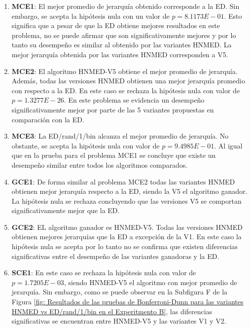 \begin{enumerate}
	\item \textbf{MCE1}: El mejor promedio de jerarquía obtenido corresponde a la ED. Sin embargo, se acepta la hipótesis nula con un valor de $p=8.1173E-01$. Esto significa que a pesar de que la ED obtiene mejores resultados en este problema,  no se puede afirmar que son significativamente mejores y por lo tanto su desempeño es similar al obtenido por las variantes HNMED. La mejor jerarquía obtenida por las variantes HNMED corresponden a V5.
	\item \textbf{MCE2}: El algoritmo HNMED-V5  obtiene el mejor promedio de jerarquía. Además, todas las versiones HNMED obtienen una mejor jerarquía promedio con respecto a la ED. En este caso se rechaza la hipótesis nula con valor de $p=1.3277E-26$. En este problema se evidencia un desempeño significativamente mejor por parte de las 5 variantes propuestas en comparación con la ED.
	
	\item \textbf{MCE3}: La ED/rand/1/bin alcanza el mejor promedio de jerarquía. No obstante, se acepta la hipótesis nula con valor de $p=9.4985E-01$. Al igual que en la prueba para el problema MCE1 se concluye que existe un desempeño similar entre todos los algoritmos comparados.
	
	\item \textbf{GCE1}: De forma similar al problema MCE2 todas las variantes HNMED obtienen mejor jerarquía respecto a la ED, siendo la V5 el algoritmo ganador. La hipótesis nula se rechaza concluyendo que las versiones V5 se comportan significativamente mejor que la ED.
	
	\item \textbf{GCE2}: EL algoritmo ganador es HNMED-V5. Todas las versiones HNMED obtienen mejores jerarquías que la ED  a excepción de la V1. En este caso la hipótesis nula se acepta por lo tanto no se confirma que existen diferencias significativas entre el desempeño de las variantes ganadoras y la ED. 
	
	\item \textbf{SCE1}: En este caso se rechaza la hipótesis nula con valor de $p=1.7205E-03$, siendo HNMED-V5 el algoritmo con mejor promedio de jerarquía. Sin embargo, como se puede observar en la Subfigura F de la Figura \ref{fig: Resultados de las pruebas de Bonferroni-Dunn para las variantes HNMED vs ED/rand/1/bin en el Experitmento B}, las diferencias significativas se encuentran entre HNMED-V5 y las variantes V1 y V2.  
	 
\end{enumerate}
